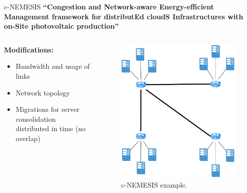 \documentclass[Ligatures=TeX,table,svgnames,usetotalslideindicator,compress,10pt,aspectratio=169]{beamer}
\begin{document}
\begin{frame}{c-NEMESIS}  
  \textbf {``\alert{Congestion} and \alert{N}etwork-aware \alert{E}nergy-efficient
    \alert{M}anagement framework for distribut\alert{E}d cloud\alert{S} \alert{I}nfrastructures with on-\alert{S}ite photovoltaic production''}
  \begin{columns}        
    \begin{column}{0.7\textwidth}
\small
\textbf{Modifications:}
\begin{itemize}
    \item Bandwidth and usage of links
    \item Network topology
    \item Migrations for server consolidation distributed in time (no overlap)

  \end{itemize}
  
\end{column}   

\begin{column}{0.3\textwidth}
      \begin{figure}[!h]
        \centering
        \includegraphics[width=.9\textwidth]{images/cnemesis_1.pdf}
        \caption{c-NEMESIS example.}
      \end{figure}
    \end{column}        

\end{columns}

\end{frame}
\end{document}
